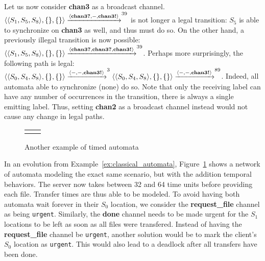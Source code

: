 \begin{example}
Let us now consider \textbf{chan3} as a broadcast channel.
$
\langle \langle S_1, S_5, S_8 \rangle, \{\}, \{\}\rangle \allowbreak
   \xrightarrow[]{\langle \textbf{chan3?}, -, \textbf{chan3!}\rangle}^{39} \allowbreak$
is not longer a legal transition: $S_5$ is able to synchronize on \textbf{chan3}
as well, and thus must do so. On the other hand, a previously illegal transition
is now possible:$
\langle \langle S_1, S_5, S_8 \rangle, \{\}, \{\}\rangle \allowbreak
   \xrightarrow[]{\langle \textbf{chan3?}, \textbf{chan3?}, \textbf{chan3!}\rangle}^{39} \allowbreak
$.
Perhaps more surprisingly, the following path is legal:
$
\langle \langle S_0, S_4, S_8 \rangle, \{\}, \{\}\rangle \allowbreak
   \xrightarrow[]{\langle -, -, \textbf{chan3!}\rangle}^{3} \allowbreak
\langle \langle S_0, S_4, S_8 \rangle, \{\}, \{\}\rangle \allowbreak
   \xrightarrow[]{\langle -, -, \textbf{chan3!}\rangle}^{89} \allowbreak
$.
Indeed, all automata able to synchronize (none) do so. Note that only the
receiving label can have any number of occurrences in the transition, there is
always a single emitting label. Thus, setting \textbf{chan2} as a broadcast
channel instead would not cause any change in legal paths.
\end{example}

\begin{figure}[hbt!]
   \centering
   \begin{tabular}{cc}
    &
   
   \end{tabular}
   \caption{Another example of timed automata}
   \label{fig:timed_automata}
\end{figure}

\begin{example}
\label{ex:timed_automata}
In an evolution from Example~\ref{ex:classical_automata},
Figure~\ref{fig:timed_automata} shows a network of automata modeling the exact
same scenario, but with the addition temporal behaviors. The server now
takes between 32 and 64 time units before providing each file. Transfer times
are thus able to be modeled. To avoid having both automata wait forever in
their $S_0$ location, we consider the \textbf{request\_file} channel as being
\texttt{urgent}. Similarly, the \textbf{done} channel needs to be made urgent
for the $S_1$ locations to be left as soon as all files were transfered. Instead
of having the \textbf{request\_file} channel be \texttt{urgent}, another
solution would be to mark the client's $S_0$ location as \texttt{urgent}. This
would also lead to a deadlock after all transfers have been done.
\end{example}

